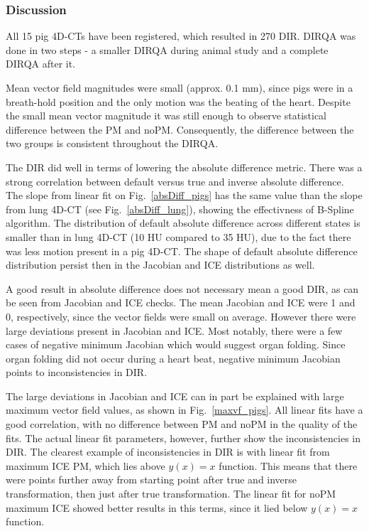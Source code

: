 \documentclass[type=dr, dr=rernat, accentcolor=tud7b,colorbacktitle, bigchapter, openright, twoside, 12pt ]{tudthesis}
\begin{document}
\subsubsection{Discussion}

All 15 pig 4D-CTs have been registered, which resulted in 270 DIR. DIRQA was done in two steps - a smaller DIRQA during animal study and a complete DIRQA after it.

Mean vector field magnitudes were small (approx. 0.1 mm), since pigs were in a breath-hold position and the only motion was the beating of the heart. 
Despite the small mean vector magnitude it was still enough to observe statistical difference between the PM and noPM.
Consequently, the difference between the two groups is consistent throughout the DIRQA.

The DIR did well in terms of lowering the absolute difference metric. There was a strong correlation between default versus true and inverse absolute difference. 
The slope from linear fit on Fig.~\ref{absDiff_pigs} has the same value than the slope from lung 4D-CT (see Fig.~\ref{absDiff_lung}), showing
the effectivness of B-Spline algorithm. The distribution of default absolute difference across different states is smaller than in lung 4D-CT (10 HU compared to 35 HU), due to the fact
there was less motion present in a pig 4D-CT. The shape of default absolute difference
distribution persist then in the Jacobian and ICE distributions as well. 

A good result in absolute difference does not necessary mean a good DIR, as can be seen from Jacobian and ICE checks. The mean Jacobian and ICE were 1 and 0, respectively, since the
vector fields were small on average. However there were large deviations present in Jacobian and ICE. Most notably, there were a few cases of negative minimum Jacobian which would suggest 
organ folding. Since organ folding did not occur during a heart beat, negative minimum Jacobian points to inconsistencies in DIR. 

The large deviations in Jacobian and ICE can in part be explained with large maximum vector field values, as shown in Fig.~\ref{maxvf_pigs}. All linear fits have a good correlation, with no
difference between PM and noPM in the quality of the fits. The actual linear fit parameters, however, further show the inconsistencies in DIR. The clearest example of inconsistencies in
DIR is with linear fit from maximum ICE PM, which lies above $y(x)=x$ function. This means that there were points further away from starting point after true and inverse transformation, 
then just after true transformation. The linear fit for noPM maximum ICE showed better results in this terms, since it lied below $y(x)=x$ function.
\end{document}
